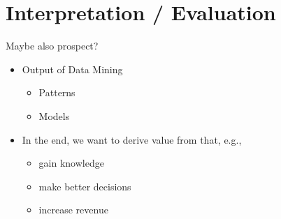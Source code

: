 \chapter{Interpretation / Evaluation}
\label{cha:interpretation_evaluation}
Maybe also prospect?
\begin{itemize}
	\item Output of Data Mining
	\begin{itemize}
		\item Patterns
		\item Models
	\end{itemize}
	\item In the end, we want to derive value from that, e.g.,
	\begin{itemize}
		\item gain knowledge
		\item make better decisions
		\item increase revenue
	\end{itemize}
\end{itemize}